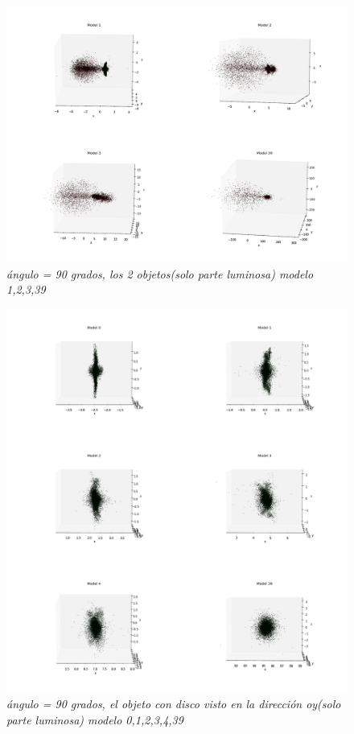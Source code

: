 \documentclass[12pt]{article} %
\renewcommand{\=}[1]{\stackrel{#1}{=}} %
\theoremstyle{definition}
\theoremstyle{remark}
\begin{document}
\begin{figure}[!ht]
 \centering
 \includegraphics[scale=0.2]{90deg_m_sep5.png}
 \caption{\emph{ ángulo = 90 grados, los 2 objetos(solo parte luminosa) modelo 1,2,3,39 }}
\end{figure}

\begin{figure}[!ht]
 \centering
 \includegraphics[scale=0.2]{90deg-m-c2y.png}
 \caption{\emph{ ángulo = 90 grados, el objeto con disco visto en la dirección oy(solo parte luminosa) modelo 0,1,2,3,4,39 }}
\end{figure}
\end{document}
